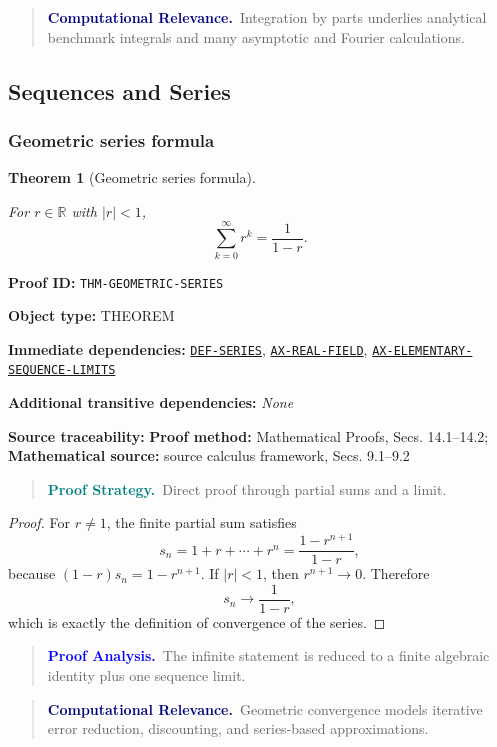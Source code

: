 \documentclass[10pt]{article}
\newcommand{\pidraw}[1]{\begingroup\urlstyle{tt}\nolinkurl{#1}\endgroup}
\newcommand{\pidref}[1]{\hyperref[prf:#1]{\pidraw{#1}}}
\newtheorem{theorem}{Theorem}[section]
\theoremstyle{definition}
\theoremstyle{remark}
\newenvironment{proofstrategy}
{\begin{quote}\small\noindent\textbf{\textcolor{teal}{Proof Strategy.}}\ }
{\end{quote}}
\newenvironment{proofanalysis}
{\begin{quote}\small\noindent\textbf{\textcolor{blue}{Proof Analysis.}}\ }
{\end{quote}}
\newenvironment{computationalrelevance}
{\begin{quote}\small\noindent\textbf{\textcolor{navy}{Computational Relevance.}}\ }
{\end{quote}}
\newcommand{\meta}[2]{\noindent\textbf{#1:} #2\par}
\begin{document}
\begin{computationalrelevance}Integration by parts underlies analytical benchmark integrals and many asymptotic and Fourier calculations.\end{computationalrelevance}

\subsection{Sequences and Series}

\subsubsection{Geometric series formula}

\begin{theorem}[Geometric series formula]\label{prf:THM-GEOMETRIC-SERIES}

For $r\in\mathbb{R}$ with $|r|<1$,
\[
\sum_{k=0}^{\infty} r^k=\frac{1}{1-r}.
\]

\end{theorem}

\meta{Proof ID}{\pidraw{THM-GEOMETRIC-SERIES}}
\meta{Object type}{THEOREM}
\meta{Immediate dependencies}{\pidref{DEF-SERIES}, \pidref{AX-REAL-FIELD}, \pidref{AX-ELEMENTARY-SEQUENCE-LIMITS}}
\meta{Additional transitive dependencies}{\emph{None}}
\meta{Source traceability}{\textbf{Proof method:} Mathematical Proofs, Secs. 14.1--14.2; \textbf{Mathematical source:} source calculus framework, Secs. 9.1--9.2}

\begin{proofstrategy}Direct proof through partial sums and a limit.\end{proofstrategy}

\begin{proof}

For $r\ne1$, the finite partial sum satisfies
\[
s_n=1+r+\cdots+r^n=\frac{1-r^{n+1}}{1-r},
\]
because $(1-r)s_n=1-r^{n+1}$. If $|r|<1$, then $r^{n+1}\to0$.
Therefore
\[
s_n\to\frac{1}{1-r},
\]
which is exactly the definition of convergence of the series.

\end{proof}

\begin{proofanalysis}The infinite statement is reduced to a finite algebraic identity plus one sequence limit.\end{proofanalysis}

\begin{computationalrelevance}Geometric convergence models iterative error reduction, discounting, and series-based approximations.\end{computationalrelevance}
\end{document}
